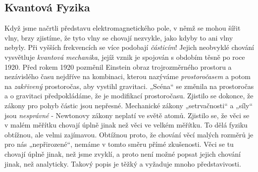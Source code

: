     \subsection{Kvantová Fyzika}\label{fyz:IchapIIsecV}
      Když jsme načrtli představu elektromagnetického pole, v němž se mohou šířit vlny, brzy
      zjistíme, že tyto vlny se chovají nezvykle, jako kdyby to ani vlny nebyly. Při vyšších
      frekvencích se více podobají \emph{částicím}! Jejich neobvyklé chování vysvětluje
      \emph{kvantová mechanika}, jejíž vznik je spojován s obdobím těsně po roce 1920. Před rokem
      1920 pozměnil Einstein obraz trojrozměrného prostoru a nezávislého času nejdříve na kombinaci,
      kterou nazýváme \emph{prostoročasem} a potom na \emph{zakřivený} prostoročas, aby vystihl
      gravitaci. „Scéna“ se změnila na prostoročas a o gravitaci předpokládáme, že je modifikací
      prostoročasu. Zjistilo se dokonce, že zákony pro pohyb částic jsou nepřesné. Mechanické zákony
      „setrvačnosti“ a „síly“ jsou \emph{nesprávné} - Newtonovy zákony neplatí ve světě atomů.
      Zjistilo se, že věci se v malém měřítku chovají úplně jinak než věci ve velkém měřítku. To
      dělá fyziku obtížnou, ale velmi zajímavou. Obtížnou proto, že chování věcí malých rozměrů je
      pro nás „nepřirozené“, nemáme v tomto směru přímé zkušenosti. Věci se tu chovají úplně jinak,
      než jsme zvyklí, a proto není možné popsat jejich chování jinak, než analyticky. Takový popis
      je těžký a vyžaduje mnoho představivosti.
      
